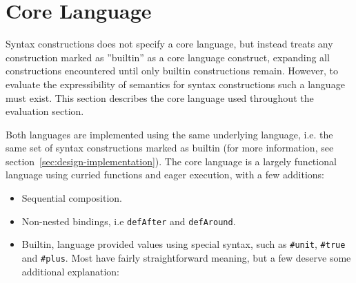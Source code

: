 \documentclass{kththesis}
\begin{document}
\section{Core Language} \label{sec:core-language}

Syntax constructions does not specify a core language, but instead treats any construction marked as ''builtin'' as a core language construct, expanding all constructions encountered until only builtin constructions remain. However, to evaluate the expressibility of semantics for syntax constructions such a language must exist. This section describes the core language used throughout the evaluation section.

Both languages are implemented using the same underlying language, i.e. the same set of syntax constructions marked as builtin (for more information, see section~\ref{sec:design-implementation}). The core language is a largely functional language using curried functions and eager execution, with a few additions:
\begin{itemize}
  \item Sequential composition.
  \item Non-nested bindings, i.e \texttt{defAfter} and \texttt{defAround}. %
  \item Builtin, language provided values using special syntax, such as \texttt{#unit}, \texttt{#true} and \texttt{#plus}. Most have fairly straightforward meaning, but a few deserve some additional explanation:
\end{itemize}
\end{document}
